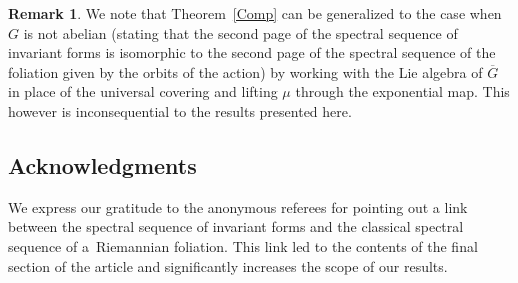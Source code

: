 \documentclass[pdftex]{sigma}
\numberwithin{equation}{section}
\theoremstyle{definition}
\newtheorem{rem}[tw]{Remark}
\begin{document}
\begin{rem} We note that Theorem~\ref{Comp} can be generalized to the case when $G$ is not abelian (stating that the second page of the spectral sequence of invariant forms is isomorphic to the second page of the spectral sequence of the foliation given by the orbits of the action) by working with the Lie algebra of $\overline{G}$ in place of the universal covering and lifting $\mu$ through the exponential map. This however is inconsequential to the results presented here.
\end{rem}

\subsection*{Acknowledgments} We express our gratitude to the anonymous referees for pointing out a link between the spectral sequence of invariant forms and the classical spectral sequence of a~Riemannian foliation. This link led to the contents of the final section of the article and significantly increases the scope of our results.

%
%
\end{document}
